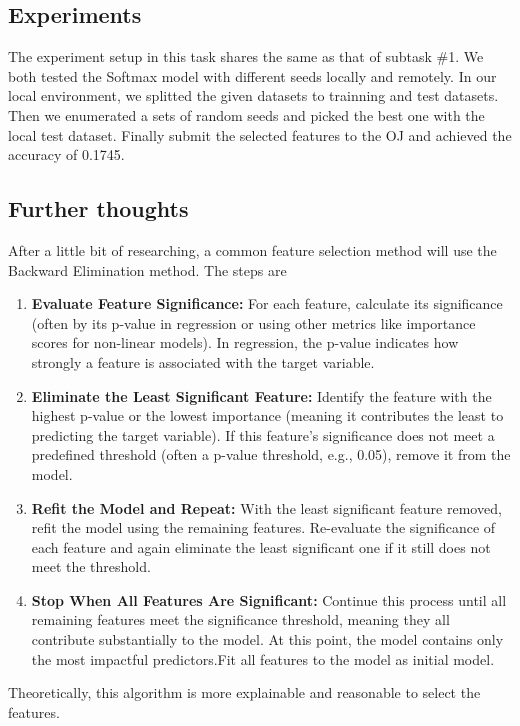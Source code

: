 \documentclass{article}
\begin{document}
\subsection{Experiments}

The experiment setup in this task shares the same as that of subtask \#1. We both tested the Softmax model with different seeds locally and remotely. In our local environment, we splitted the given datasets to trainning and test datasets. Then we enumerated a sets of random seeds and picked the best one with the local test dataset. Finally submit the selected features to the OJ and achieved the accuracy of 0.1745.

\subsection{Further thoughts}

After a little bit of researching, a common feature selection method will use the Backward Elimination method. The steps are
\begin{enumerate}
    \item \textbf{Evaluate Feature Significance:} For each feature, calculate its significance (often by its p-value in regression or using other metrics like importance scores for non-linear models). In regression, the p-value indicates how strongly a feature is associated with the target variable.
    \item \textbf{Eliminate the Least Significant Feature:} Identify the feature with the highest p-value or the lowest importance (meaning it contributes the least to predicting the target variable). If this feature's significance does not meet a predefined threshold (often a p-value threshold, e.g., 0.05), remove it from the model.
    \item \textbf{Refit the Model and Repeat:} With the least significant feature removed, refit the model using the remaining features. Re-evaluate the significance of each feature and again eliminate the least significant one if it still does not meet the threshold.
    \item \textbf{Stop When All Features Are Significant:} Continue this process until all remaining features meet the significance threshold, meaning they all contribute substantially to the model. At this point, the model contains only the most impactful predictors.Fit all features to the model as initial model.
\end{enumerate}

Theoretically, this algorithm is more explainable and reasonable to select the features.
\end{document}
